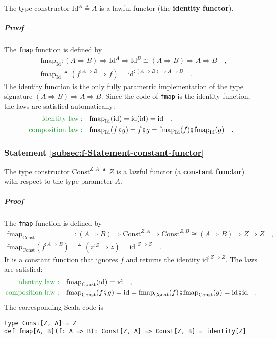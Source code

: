 The type constructor $\text{Id}^{A}\triangleq A$ is a lawful functor
(the \textbf{identity functor}).

\subparagraph{Proof}

The \lstinline!fmap! function is defined by
\begin{align*}
 & \text{fmap}_{\text{Id}}:\left(A\Rightarrow B\right)\Rightarrow\text{Id}^{A}\Rightarrow\text{Id}^{B}\cong\left(A\Rightarrow B\right)\Rightarrow A\Rightarrow B\quad,\\
 & \text{fmap}_{\text{Id}}\triangleq(f^{:A\Rightarrow B}\Rightarrow f)=\text{id}^{:(A\Rightarrow B)\Rightarrow A\Rightarrow B}\quad.
\end{align*}
The identity function is the only fully parametric implementation
of the type signature $\left(A\Rightarrow B\right)\Rightarrow A\Rightarrow B$.
Since the code of \lstinline!fmap! is the identity function, the
laws are satisfied automatically:
\begin{align*}
{\color{greenunder}\text{identity law}:}\quad & \text{fmap}_{\text{Id}}(\text{id})=\text{id}(\text{id})=\text{id}\quad,\\
{\color{greenunder}\text{composition law}:}\quad & \text{\ensuremath{\text{fmap}_{\text{Id}}}}(f\bef g)=f\bef g=\text{fmap}_{\text{Id}}(f)\bef\text{fmap}_{\text{Id}}(g)\quad.
\end{align*}


\subsubsection{Statement \label{subsec:f-Statement-constant-functor}\ref{subsec:f-Statement-constant-functor}}

The type constructor $\text{Const}^{Z,A}\triangleq Z$
is a lawful functor (a \textbf{constant functor}) with respect to
the type parameter $A$.

\subparagraph{Proof}

The \lstinline!fmap! function is defined by
\begin{align*}
\text{fmap}_{\text{Const}} & :\left(A\Rightarrow B\right)\Rightarrow\text{Const}^{Z,A}\Rightarrow\text{Const}^{Z,B}\cong\left(A\Rightarrow B\right)\Rightarrow Z\Rightarrow Z\quad,\\
\text{fmap}_{\text{Const}}(f^{:A\Rightarrow B}) & \triangleq(z^{:Z}\Rightarrow z)=\text{id}^{:Z\Rightarrow Z}\quad.
\end{align*}
It is a constant function that ignores $f$ and returns the identity
$\text{id}^{:Z\Rightarrow Z}$. The laws are satisfied:
\begin{align*}
{\color{greenunder}\text{identity law}:}\quad & \text{fmap}_{\text{Const}}(\text{id})=\text{id}\quad,\\
{\color{greenunder}\text{composition law}:}\quad & \text{\ensuremath{\text{fmap}_{\text{Const}}}}(f\bef g)=\text{id}=\text{fmap}_{\text{Const}}(f)\bef\text{fmap}_{\text{Const}}(g)=\text{id}\bef\text{id}\quad.
\end{align*}
The corresponding Scala code is
\begin{lstlisting}
type Const[Z, A] = Z
def fmap[A, B](f: A => B): Const[Z, A] => Const[Z, B] = identity[Z]
\end{lstlisting}

